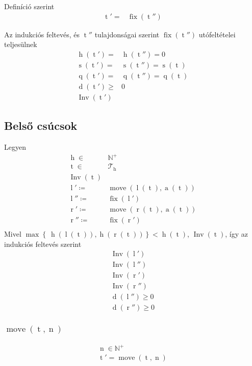 \documentclass{article}
\newcommand*{\NaturalsP}{\ensuremath{\mathbb{N}^+}}
\newcommand*{\Trees}{\ensuremath{\mathcal{T}}}
\newcommand*{\fFix}{\ensuremath{\operatorname{fix}}}
\newcommand*{\fInv}{\ensuremath{\operatorname{Inv}}}
\newcommand*{\fMove}{\ensuremath{\operatorname{move}}}
\newcommand*{\sAccumulated}[1]{\ensuremath{\operatorname{a}\left(#1\right)}}
\newcommand*{\sDiff}[1]{\ensuremath{\operatorname{d}\left(#1\right)}}
\newcommand*{\sHeight}[1]{\ensuremath{\operatorname{h}\left(#1\right)}}
\newcommand*{\sLeft}[1]{\ensuremath{\operatorname{l}\left(#1\right)}}
\newcommand*{\sPosition}[1]{\ensuremath{\operatorname{q}\left(#1\right)}}
\newcommand*{\sPrimes}[1]{\ensuremath{\operatorname{s}\left(#1\right)}}
\newcommand*{\sRight}[1]{\ensuremath{\operatorname{r}\left(#1\right)}}
\newcommand*{\vH}{\ensuremath{\operatorname{h}}}
\newcommand*{\vL}{\ensuremath{\operatorname{l}}}
\newcommand*{\vN}{\ensuremath{\operatorname{n}}}
\newcommand*{\vR}{\ensuremath{\operatorname{r}}}
\newcommand*{\vT}{\ensuremath{\operatorname{t}}}
\begin{document}
Definíció szerint
\begin{align*}
\vT' =& \fFix(\vT'')
\end{align*}

Az indukciós feltevés, és $\vT''$ tulajdonságai szerint $ \fFix(\vT'') $
utófeltételei teljesülnek
\begin{align*}
\sHeight{\vT'} =& \sHeight{\vT''} = 0 \tag{F1} \\
\sPrimes{\vT'} =& \sPrimes{\vT''} = \sPrimes{{\vT}} \tag{F2} \\
\sPosition{\vT'} =& \sPosition{\vT''} = \sPosition{\vT} \tag{F3} \\
\sDiff{\vT'} \ge& 0 \tag{F4} \\
\fInv(\vT') \tag{F5}
\end{align*}

\subsection{Belső csúcsok}

Legyen
\begin{align*}
\vH \in& \NaturalsP \\
\vT \in& \Trees_{\vH} \\
\fInv(\vT) \\
\vL' \coloneqq& \fMove(\sLeft{\vT}, \sAccumulated{\vT}) \\
\vL'' \coloneqq& \fFix(\vL') \\
\vR' \coloneqq& \fMove(\sRight{\vT}, \sAccumulated{\vT}) \\
\vR'' \coloneqq& \fFix(\vR') \\
\end{align*}
Mivel
$\max\left\lbrace\ \sHeight{\sLeft{\vT}}, \sHeight{\sRight{\vT}} \right\rbrace
	<\sHeight{\vT}$, $\fInv(\vT)$, így az indukciós feltevés szerint
\begin{align*}
\fInv(\vL') \\
\fInv(\vL'') \\
\fInv(\vR') \\
\fInv(\vR'') \\
\sDiff{\vL''} \ge 0 \\
\sDiff{\vR''} \ge 0
\end{align*}

\subsubsection{$ \fMove(\vT, \vN) $}

\begin{align*}
\vN \in \NaturalsP \\
\vT' = \fMove(\vT, \vN)
\end{align*}
\end{document}
